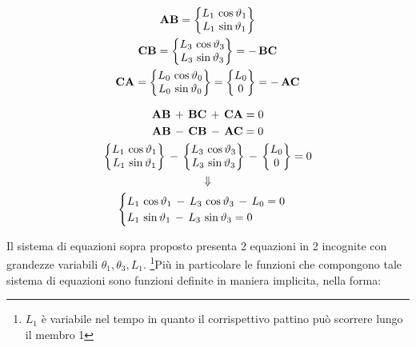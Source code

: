 			\begin{minipage}{.5\textwidth}
				\begin{gather*}
				\mathbf{AB} = \begin{Bmatrix}L_1\,\cos{\vartheta_1}\\ L_1 \, \sin{\vartheta_1}\end{Bmatrix}\\
				\mathbf{CB} = \begin{Bmatrix}L_3\,\cos{\vartheta_3}\\ L_3 \, \sin{\vartheta_3}\end{Bmatrix} = -\, \mathbf{BC}\\
				\mathbf{CA} = \begin{Bmatrix}L_0\,\cos{\vartheta_0} \\ L_0 \, \sin{\vartheta_0}\end{Bmatrix}=\begin{Bmatrix}L_0\\0\end{Bmatrix} = -\, \mathbf{AC}
				\end{gather*}
			\end{minipage}
			\hfill
			\begin{minipage}{.5\textwidth}
				\begin{gather*}
					\mathbf{AB}\,+\,\mathbf{BC}\,+\,\mathbf{CA} = 0\\
					\mathbf{AB}\,-\,\mathbf{CB}\,-\,\mathbf{AC} = 0\\
					\begin{Bmatrix}L_1\,\cos{\vartheta_1}\\L_1\,\sin{\vartheta_1}\end{Bmatrix}\,-\,\begin{Bmatrix}L_3\,\cos{\vartheta_3}\\L_3\,\sin{\vartheta_3}\end{Bmatrix}\,-\,\begin{Bmatrix}L_0\\0\end{Bmatrix} = 0\\
					\Downarrow\\
					\begin{cases}
						L_1\,\cos{\vartheta_1}\,-\,L_3\,\cos{\vartheta_3}\,-\,L_0 = 0\\
						L_1\,\sin{\vartheta_1}\,-\,L_3\,\sin{\vartheta_3} = 0
					\end{cases}
				\end{gather*}
			\end{minipage}
			\vspace{1mm}
			
			Il sistema di equazioni sopra proposto presenta 2 equazioni in 2 incognite con grandezze variabili $\theta_1, \theta_3, L_1$.%
			\footnote{$L_1$ è variabile nel tempo in quanto il corrispettivo pattino può scorrere lungo il membro 1}Più in particolare le funzioni che compongono tale sistema di equazioni sono funzioni definite in maniera implicita, nella forma:
			
